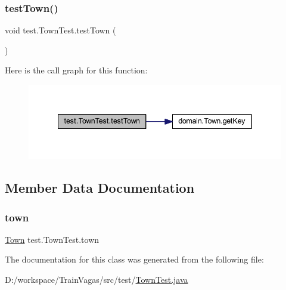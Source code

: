 \subsubsection{\texorpdfstring{test\+Town()}{testTown()}}
{\footnotesize\ttfamily void test.\+Town\+Test.\+test\+Town (\begin{DoxyParamCaption}{ }\end{DoxyParamCaption})}

Here is the call graph for this function\+:\nopagebreak
\begin{figure}[H]
\begin{center}
\leavevmode
\includegraphics[width=342pt]{classtest_1_1_town_test_a7cededa2b2d7c866897875e8b29f6c0d_cgraph}
\end{center}
\end{figure}


\subsection{Member Data Documentation}
\mbox{\label{classtest_1_1_town_test_a413a6f4701d56787ee29731259bbd26a}} 
\subsubsection{\texorpdfstring{town}{town}}
{\footnotesize\ttfamily \hyperlink{classdomain_1_1_town}{Town} test.\+Town\+Test.\+town\hspace{0.3cm}{\ttfamily [package]}}



The documentation for this class was generated from the following file\+:\begin{DoxyCompactItemize}
\item 
D\+:/workspace/\+Train\+Vagas/src/test/\hyperlink{_town_test_8java}{Town\+Test.\+java}\end{DoxyCompactItemize}
